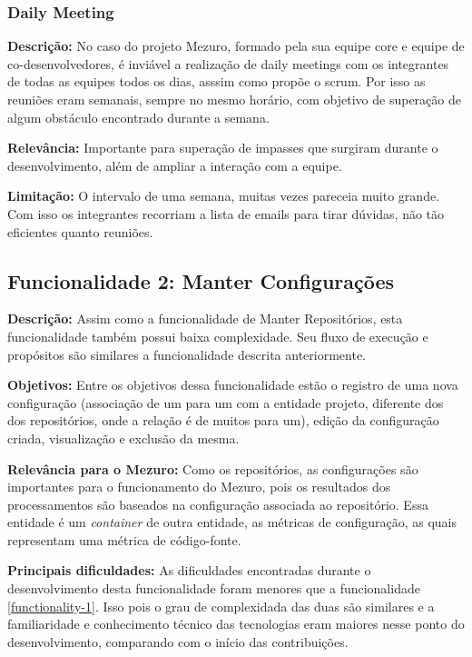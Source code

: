 \subsubsection{Daily Meeting}

\textbf{Descrição:} No caso do projeto Mezuro, formado pela sua equipe core e equipe de co-desenvolvedores, é inviável a realização de daily meetings com os integrantes de todas as equipes todos os dias, asssim como propõe o scrum. Por isso as reuniões eram semanais, sempre no mesmo horário, com objetivo de superação de algum obstáculo encontrado durante a semana.

\textbf{Relevância:} Importante para superação de impasses que surgiram durante o desenvolvimento, além de ampliar a interação com a equipe.

\textbf{Limitação:} O intervalo de uma semana, muitas vezes pareceia muito grande. Com isso os integrantes recorriam a lista de emails para tirar dúvidas, não tão eficientes quanto reuniões.

\subsection{Funcionalidade 2: Manter Configurações}
\label{functionality-2}

\textbf{Descrição:} Assim como a funcionalidade de Manter Repositórios, esta funcionalidade também possui baixa complexidade. Seu fluxo de execução e propósitos são similares a funcionalidade descrita anteriormente.

\textbf{Objetivos:} Entre os objetivos dessa funcionalidade estão o registro de uma nova configuração (associação de um para um com a entidade projeto, diferente dos dos repositórios, onde a relação é de muitos para um), edição da configuração criada, visualização e exclusão da mesma.

\textbf{Relevância para o Mezuro:} Como os repositórios, as configurações são importantes para o funcionamento do Mezuro, pois os resultados dos processamentos são baseados na configuração associada ao repositório. Essa entidade é um \textit{container} de outra entidade, as métricas de configuração, as quais representam uma métrica de código-fonte.

\textbf{Principais dificuldades:} As dificuldades encontradas durante o desenvolvimento desta funcionalidade foram menores que a funcionalidade \ref{functionality-1}. Isso pois o grau de complexidada das duas são similares e a familiaridade e conhecimento técnico das tecnologias eram maiores nesse ponto do desenvolvimento, comparando com o início das contribuições.

